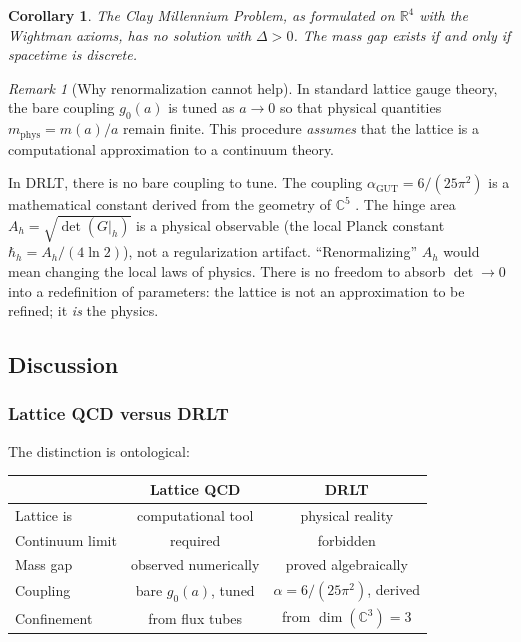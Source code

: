 \documentclass[12pt]{article}
\newtheorem{corollary}[theorem]{Corollary}
\theoremstyle{remark}
\newtheorem{remark}[theorem]{Remark}
\theoremstyle{definition}
\newcommand{\CC}{\mathbb{C}}
\newcommand{\RR}{\mathbb{R}}
\newcommand{\agut}{\alpha_{\mathrm{GUT}}}
\begin{document}
\begin{corollary}
The Clay Millennium Problem, as formulated on $\RR^4$ with the
Wightman axioms, has no solution with $\Delta > 0$. The mass gap exists
if and only if spacetime is discrete.
\end{corollary}

\begin{remark}[Why renormalization cannot help]
In standard lattice gauge theory, the bare coupling $g_0(a)$ is tuned as
$a \to 0$ so that physical quantities $m_{\mathrm{phys}} = m(a)/a$
remain finite. This procedure \emph{assumes} that the lattice is a
computational approximation to a continuum theory.

In DRLT, there is no bare coupling to tune. The coupling
$\agut = 6/(25\pi^2)$ is a mathematical constant
derived from the geometry of $\CC^5$ . The hinge
area $A_h = \sqrt{\det(G|_h)}$ is a physical observable (the local
Planck constant $\hbar_h = A_h/(4\ln 2)$), not a regularization
artifact. ``Renormalizing'' $A_h$ would mean changing the local laws of
physics. There is no freedom to absorb $\det \to 0$ into a redefinition
of parameters: the lattice is not an approximation to be refined; it
\emph{is} the physics.
\end{remark}

\subsection{Discussion}
\label{sec:discussion}

\subsubsection{Lattice QCD versus DRLT}

The distinction is ontological:

\begin{center}
\begin{tabular}{lcc}
\hline
& Lattice QCD & DRLT \\
\hline
Lattice is & computational tool & physical reality \\
Continuum limit & required & forbidden \\
Mass gap & observed numerically & proved algebraically \\
Coupling & bare $g_0(a)$, tuned & $\alpha = 6/(25\pi^2)$, derived \\
Confinement & from flux tubes & from $\dim(\CC^3) = 3$ \\
\hline
\end{tabular}
\end{center}
\end{document}
